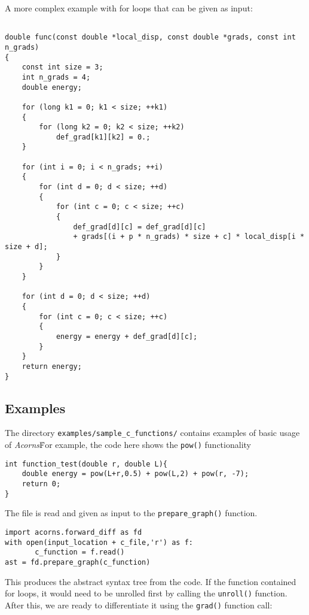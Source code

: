 \documentclass[a4,oneside]{book}
\def\codesize{\small}
\def\Acorns{\emph{Acorns}}
\def\code#1{{\codesize\texttt{#1}}}
\begin{document}
A more complex example with for loops that can be given as input:

\begin{lstlisting}

double func(const double *local_disp, const double *grads, const int n_grads)
{
    const int size = 3;
    int n_grads = 4;
    double energy;

    for (long k1 = 0; k1 < size; ++k1)
    {
        for (long k2 = 0; k2 < size; ++k2)
            def_grad[k1][k2] = 0.;
    }

    for (int i = 0; i < n_grads; ++i)
    {
        for (int d = 0; d < size; ++d)
        {
            for (int c = 0; c < size; ++c)
            {
                def_grad[d][c] = def_grad[d][c] 
                + grads[(i + p * n_grads) * size + c] * local_disp[i * size + d];
            }
        }
    }    
    
    for (int d = 0; d < size; ++d)
    {
        for (int c = 0; c < size; ++c)
        {
            energy = energy + def_grad[d][c];
        }
    }    
    return energy;
}    
\end{lstlisting}




\subsection{Examples}
\label{sec:examples}

The directory \code{examples/sample\_c\_functions/} contains examples of basic usage of \Acorns\.  

For example, the code here shows the \code{pow()} functionality

\begin{lstlisting}
int function_test(double r, double L){ 
    double energy = pow(L+r,0.5) + pow(L,2) + pow(r, -7); 
    return 0; 
}
\end{lstlisting}

The file is read and given as input to the \code{prepare\_graph()} function.

\begin{lstlisting}
import acorns.forward_diff as fd
with open(input_location + c_file,'r') as f:
       c_function = f.read()
ast = fd.prepare_graph(c_function)
\end{lstlisting}

This produces the abstract syntax tree from the code. If the function contained for loops, it would need to be unrolled first by calling the \code{unroll()} function. After this, we are ready to differentiate it using the \code{grad()} function call:
\end{document}
